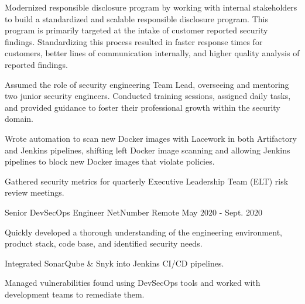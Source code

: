 \begin{cventries}
{\begin{cvitems}
{        }
        \item {
          Modernized responsible disclosure program by working with internal stakeholders to build a standardized and scalable responsible disclosure program. This program is primarily targeted at the intake of customer reported security findings. Standardizing this process resulted in faster response times for customers, better lines of communication internally, and higher quality analysis of reported findings.
        }
        \item {
          Assumed the role of security engineering Team Lead, overseeing and mentoring two junior security engineers. Conducted training sessions, assigned daily tasks, and provided guidance to foster their professional growth within the security domain.
        }
        \item {
          Wrote automation to scan new Docker images with Lacework in both Artifactory and Jenkins pipelines, shifting left Docker image scanning and allowing Jenkins pipelines to block new Docker images that violate policies.
        }
        \item {
          Gathered security metrics for quarterly Executive Leadership Team (ELT) risk review meetings.
        }
      \end{cvitems}
    }

  \cventry
    {Senior DevSecOps Engineer} %
    {NetNumber} %
    {Remote} %
    {May 2020 - Sept. 2020} %
    {
      \begin{cvitems} %
        \item {
          Quickly developed a thorough understanding of the engineering environment, product stack, code base, and identified security needs.
        }
        \item {
          Integrated SonarQube \& Snyk into Jenkins CI/CD pipelines.
        }
        \item {
          Managed vulnerabilities found using DevSecOps tools and worked with development teams to remediate them.
        }
      \end{cvitems}
    }


\end{cventries}
